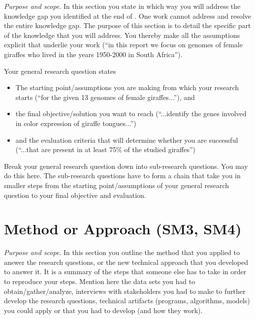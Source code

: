 \emph{Purpose and scope}.
In this section you state in which way you will address the knowledge gap you identified at the end of .
One work cannot address and resolve the entire knowledge gap.
The purpose of this section is to detail the specific part of the knowledge that you will address.
You thereby make all the assumptions explicit that underlie your work (``in this report we focus on genomes of female giraffes who lived in the years 1950-2000 in South Africa'').

Your general research question states
\begin{itemize}
  \item The starting point/assumptions you are making from which your research starts (``for the given 13 genomes of female giraffes...''), and
  \item the final objective/solution you want to reach (``...identify the genes involved in color expression of giraffe tongues...'')
  \item and the evaluation criteria that will determine whether you are successful (``...that are present in at least 75\% of the studied giraffes'')
\end{itemize}

Break your general research question down into sub-research questions.
You may do this here.
The sub-research questions have to form a chain that take you in smaller steps from the starting point/assumptions of your general research question to your final objective and evaluation.

\section{Method or Approach (SM3, SM4)}\label{sec:introduction:method}

\emph{Purpose and scope}.
In this section you outline the method that you applied to answer the research questions, or the new technical approach that you developed to answer it.
It is a summary of the steps that someone else has to take in order to reproduce your steps.
Mention here the data sets you had to obtain/gather/analyze, interviews with stakeholders you had to make to further develop the research questions, technical artifacts (programs, algorithms, models) you could apply or that you had to develop (and how they work).

